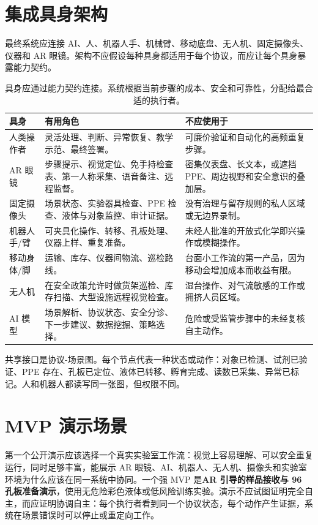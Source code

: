 \documentclass[11pt,fontset=none]{ctexart}
\begin{document}
\section{集成具身架构}

最终系统应连接 AI、人、机器人手、机械臂、移动底盘、无人机、固定摄像头、仪器和 AR 眼镜。架构不应假设每种具身都适用于每个协议，而应让每个具身暴露能力契约。

\begin{table}[htbp]
\centering
\small
\begin{tabularx}{\linewidth}{@{}L{2.35cm}Y Y@{}}
\toprule
\textbf{具身} & \textbf{有用角色} & \textbf{不应使用于} \\
\midrule
人类操作者 & 灵活处理、判断、异常恢复、教学示范、最终签署。 & 可廉价验证和自动化的高频重复步骤。 \\
AR 眼镜 & 步骤提示、视觉定位、免手持检查表、第一人称采集、语音备注、远程监督。 & 密集仪表盘、长文本，或遮挡 PPE、周边视野和安全意识的叠加层。 \\
固定摄像头 & 场景状态、实验器具检查、PPE 检查、液体与对象监控、审计证据。 & 没有治理与留存规则的私人区域或无边界录制。 \\
机器人手/臂 & 可夹具化操作、转移、孔板处理、仪器上样、重复准备。 & 未经人批准的开放式化学即兴操作或模糊操作。 \\
移动身体/脚 & 运输、库存、仪器间物流、巡检路线。 & 台面小工作流的第一产品，因为移动会增加成本而收益有限。 \\
无人机 & 在安全政策允许时做货架巡检、库存扫描、大型设施远程视觉检查。 & 湿台操作、对气流敏感的工作或拥挤人员区域。 \\
AI 模型 & 场景解析、协议状态、安全分诊、下一步建议、数据挖掘、策略选择。 & 危险或受监管步骤中的未经复核自主动作。 \\
\bottomrule
\end{tabularx}
\caption{具身应通过能力契约连接。系统根据当前步骤的成本、安全和可靠性，分配给最合适的执行者。}
\label{tab:embodiments-cn}
\end{table}

共享接口是协议-场景图。每个节点代表一种状态或动作：对象已检测、试剂已验证、PPE 存在、孔板已定位、液体已转移、孵育完成、读数已采集、异常已标记。人和机器人都读写同一张图，但权限不同。

\section{MVP 演示场景}

第一个公开演示应该选择一个真实实验室工作流：视觉上容易理解、可以安全重复运行，同时足够丰富，能展示 AR 眼镜、AI、机器人、无人机、摄像头和实验室环境为什么应该在同一系统中协同。一个强 MVP 是\textbf{AR 引导的样品接收与 96 孔板准备演示}，使用无危险彩色液体或低风险训练实验。演示不应试图证明完全自主，而应证明协调自主：每个执行者看到同一个协议状态，每个动作产生证据，系统在场景错误时可以停止或重定向工作。
\end{document}
